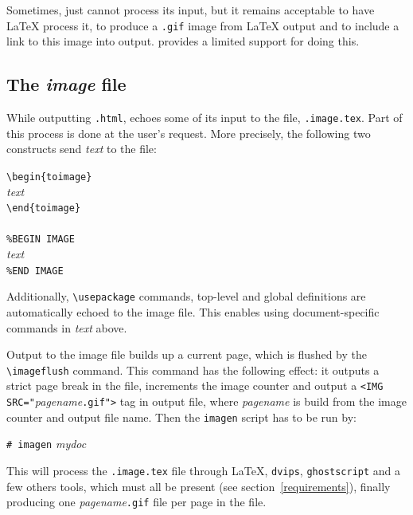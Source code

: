 \label{imagen}
Sometimes,
\hevea{} just cannot process its input, but it remains acceptable to
have \LaTeX{} process it, to produce a \texttt{.gif} image from
\LaTeX{} output and to include a link to this image into \hevea{}
output.
\hevea{} provides a limited support for doing this.

\subsection{The \textit{image}\label{image:file} file}

While outputting \texttt{.html}, \hevea{} echoes some
of its input to the  file,
\texttt{.image.tex}.
Part of this process is done at the user's request.
More precisely, the following two constructs
send \textit{text} to the  file:
\begin{flushleft}
\verb+\begin{toimage}+\\
\textit{text}\\
\verb+\end{toimage}+\\
~\\
\verb+%BEGIN IMAGE+\\
\textit{text}\\
\verb+%END IMAGE+
\end{flushleft}
Additionally, \verb+\usepackage+ commands, top-level and global
definitions
are automatically echoed to the image file. This enables using
document-specific commands in \textit{text} above.


Output to the image file builds up a current page, which is flushed
by the \verb+\imageflush+ command.
This command has the following effect:  it outputs a strict page break
in the  file, increments the image counter and
output a \verb+<IMG SRC="+\textit{pagename}\verb+.gif">+ tag in \hevea{}
output file, where \textit{pagename} is build from the image counter
and \hevea{} output file name.
Then the \verb+imagen+ script has to be run by:
\begin{flushleft}
\verb+# imagen+ \textit{mydoc}
\end{flushleft}
\noindent This will process the \texttt{.image.tex}
file through \LaTeX,
\texttt{dvips}, \texttt{ghostscript} and a few others tools, which must all be
present  (see section~\ref{requirements}), finally producing one
\textit{pagename}\texttt{.gif} file per page in the 
file.

